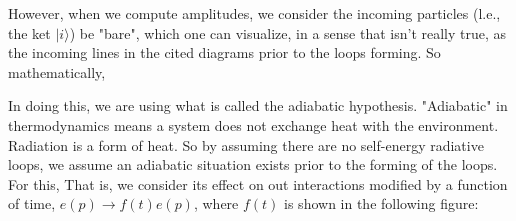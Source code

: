 However, when we compute amplitudes, we consider the incoming particles (l.e., the ket $|i\rangle$) be "bare", which one can visualize, in a sense that isn't really true, as the incoming lines in the cited diagrams prior to the loops forming. So mathematically, 

In doing this, we are using what is called the adiabatic hypothesis. "Adiabatic" in thermodynamics means a system does not exchange heat with the environment. Radiation is a form of heat. So by assuming there are no self-energy radiative loops, we assume an adiabatic situation exists prior to the forming of the loops. For this, \textbf{} That is, we consider its effect on out interactions modified by a function of time, $e(p)\to f(t)e(p)$, where $f(t)$ is shown in the following figure:
